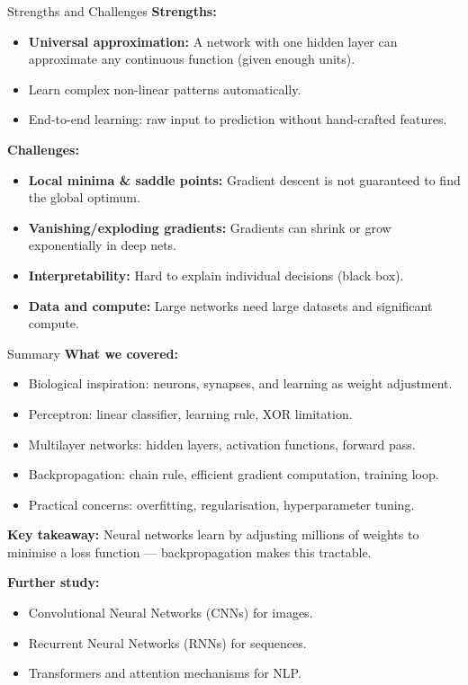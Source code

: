 \documentclass[10pt]{beamer}
\begin{document}
\begin{frame}{Strengths and Challenges}
    \textbf{Strengths:}
    \begin{itemize}
        \item \textbf{Universal approximation:} A network with one hidden layer can approximate any continuous function (given enough units).
        \item Learn complex non-linear patterns automatically.
        \item End-to-end learning: raw input to prediction without hand-crafted features.
    \end{itemize}

    \vspace{0.2cm}
    \textbf{Challenges:}
    \begin{itemize}
        \item \textbf{Local minima \& saddle points:} Gradient descent is not guaranteed to find the global optimum.
        \item \textbf{Vanishing/exploding gradients:} Gradients can shrink or grow exponentially in deep nets.
        \item \textbf{Interpretability:} Hard to explain individual decisions (black box).
        \item \textbf{Data and compute:} Large networks need large datasets and significant compute.
    \end{itemize}
\end{frame}

\begin{frame}{Summary}
    \textbf{What we covered:}
    \begin{itemize}
        \item Biological inspiration: neurons, synapses, and learning as weight adjustment.
        \item Perceptron: linear classifier, learning rule, XOR limitation.
        \item Multilayer networks: hidden layers, activation functions, forward pass.
        \item Backpropagation: chain rule, efficient gradient computation, training loop.
        \item Practical concerns: overfitting, regularisation, hyperparameter tuning.
    \end{itemize}

    \vspace{0.2cm}
    \textbf{Key takeaway:} Neural networks learn by adjusting millions of weights to minimise a loss function --- backpropagation makes this tractable.

    \vspace{0.2cm}
    \textbf{Further study:}
    \begin{itemize}
        \item Convolutional Neural Networks (CNNs) for images.
        \item Recurrent Neural Networks (RNNs) for sequences.
        \item Transformers and attention mechanisms for NLP.
    \end{itemize}
\end{frame}
\end{document}
